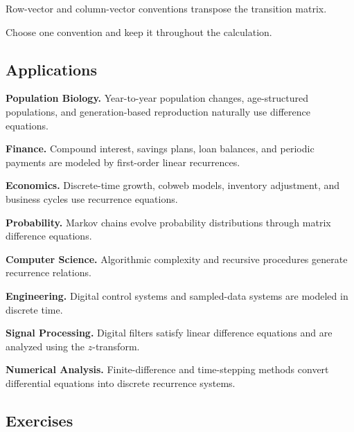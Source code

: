 Row-vector and column-vector conventions transpose the transition matrix.

Choose one convention and keep it throughout the calculation.

\subsection{Applications}
\label{subsec:difference-equation-applications}

\begin{applicationbox}

\textbf{Population Biology.}
Year-to-year population changes, age-structured populations, and
generation-based reproduction naturally use difference equations.

\medskip

\textbf{Finance.}
Compound interest, savings plans, loan balances, and periodic payments
are modeled by first-order linear recurrences.

\medskip

\textbf{Economics.}
Discrete-time growth, cobweb models, inventory adjustment, and business
cycles use recurrence equations.

\medskip

\textbf{Probability.}
Markov chains evolve probability distributions through matrix difference
equations.

\medskip

\textbf{Computer Science.}
Algorithmic complexity and recursive procedures generate recurrence
relations.

\medskip

\textbf{Engineering.}
Digital control systems and sampled-data systems are modeled in discrete
time.

\medskip

\textbf{Signal Processing.}
Digital filters satisfy linear difference equations and are analyzed
using the \(z\)-transform.

\medskip

\textbf{Numerical Analysis.}
Finite-difference and time-stepping methods convert differential equations
into discrete recurrence systems.

\end{applicationbox}

\subsection{Exercises}
\label{subsec:difference-equation-exercises}

